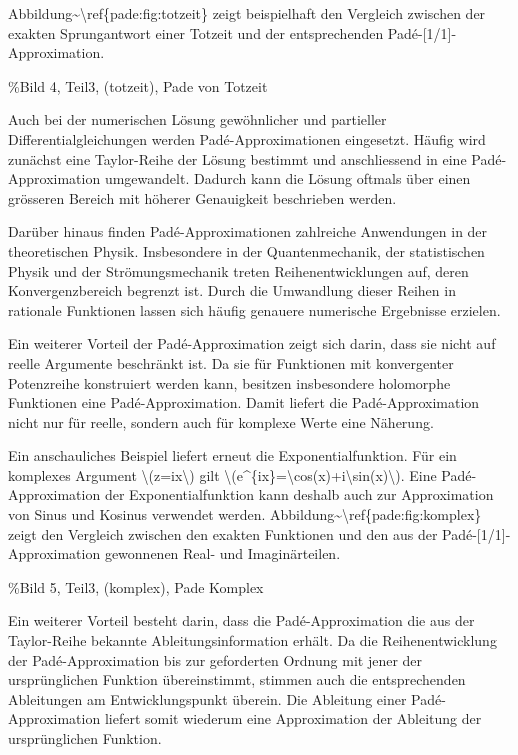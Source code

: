 Abbildung\textasciitilde\textbackslash ref\{pade:fig:totzeit\} zeigt
beispielhaft den Vergleich zwischen der exakten Sprungantwort einer
Totzeit und der entsprechenden Padé-{[}1/1{]}-Approximation.

\%Bild 4, Teil3, (totzeit), Pade von Totzeit

Auch bei der numerischen Lösung gewöhnlicher und partieller
Differentialgleichungen werden Padé-Approximationen eingesetzt. Häufig
wird zunächst eine Taylor-Reihe der Lösung bestimmt und anschliessend in
eine Padé-Approximation umgewandelt. Dadurch kann die Lösung oftmals
über einen grösseren Bereich mit höherer Genauigkeit beschrieben werden.

Darüber hinaus finden Padé-Approximationen zahlreiche Anwendungen in der
theoretischen Physik. Insbesondere in der Quantenmechanik, der
statistischen Physik und der Strömungsmechanik treten
Reihenentwicklungen auf, deren Konvergenzbereich begrenzt ist. Durch die
Umwandlung dieser Reihen in rationale Funktionen lassen sich häufig
genauere numerische Ergebnisse erzielen.

Ein weiterer Vorteil der Padé-Approximation zeigt sich darin, dass sie
nicht auf reelle Argumente beschränkt ist. Da sie für Funktionen mit
konvergenter Potenzreihe konstruiert werden kann, besitzen insbesondere
holomorphe Funktionen eine Padé-Approximation. Damit liefert die
Padé-Approximation nicht nur für reelle, sondern auch für komplexe Werte
eine Näherung.

Ein anschauliches Beispiel liefert erneut die Exponentialfunktion. Für
ein komplexes Argument \textbackslash(z=ix\textbackslash) gilt
\textbackslash(e\^{}\{ix\}=\textbackslash cos(x)+i\textbackslash sin(x)\textbackslash).
Eine Padé-Approximation der Exponentialfunktion kann deshalb auch zur
Approximation von Sinus und Kosinus verwendet werden.
Abbildung\textasciitilde\textbackslash ref\{pade:fig:komplex\} zeigt den
Vergleich zwischen den exakten Funktionen und den aus der
Padé-{[}1/1{]}-Approximation gewonnenen Real- und Imaginärteilen.

\%Bild 5, Teil3, (komplex), Pade Komplex

Ein weiterer Vorteil besteht darin, dass die Padé-Approximation die aus
der Taylor-Reihe bekannte Ableitungsinformation erhält. Da die
Reihenentwicklung der Padé-Approximation bis zur geforderten Ordnung mit
jener der ursprünglichen Funktion übereinstimmt, stimmen auch die
entsprechenden Ableitungen am Entwicklungspunkt überein. Die Ableitung
einer Padé-Approximation liefert somit wiederum eine Approximation der
Ableitung der ursprünglichen Funktion.

